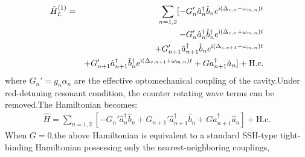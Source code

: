 \documentclass{article}
\begin{document}
\begin{eqnarray}\label{eq9}
\hat H_{L}^{(1)} &=& \sum_{n=1,2}[-G_{n}'\hat a_{n}^{\dag}\hat b_{n}e^{{\rm i}(\Delta_{c,n}-\omega_{m,n})t}\nonumber\\
&& -G_{n}'\hat a_{n}^{\dag}\hat b_{n}^{\dag}e^{{\rm i}(\Delta_{c,n}+\omega_{m,n})t} \nonumber \\
&& +G_{n+1}'\hat a_{n+1}^{\dag}\hat b_{n}e^{{\rm i}(\Delta_{c,n+1}-\omega_{m,n})t} \nonumber \\
&& +G_{n+1}'\hat a_{n+1}^\dag\hat b_n^\dag e^{{\rm i}(\Delta_{c,n+1}+\omega_{m,n})t}+Ga_{n+1}^\dag \hat a_n]+\mathrm{H.c.}
\end{eqnarray} 
where $G_{n}'=g_n\alpha_n$ are the effective optomechanical coupling  of the cavity.Under red-detuning resonant condition, the counter rotating wave terms  can be removed.The Hamiltonian becomes:
\begin{eqnarray}\label{eq10}
\hat H=\sum_{n=1,2}[-G_n'\hat a_n^{\dag}\hat b_n+G_{n+1}'\hat a_{n+1}^{\dag} \hat b_n + G a_{n+1}^{\dag}\hat a_n]+\mathrm{H.c.}
\end{eqnarray}
When $G = 0$,the above Hamiltonian is equivalent to a standard SSH-type tight-binding Hamiltonian possessing only the nearest-neighboring couplings, 
\end{document}
